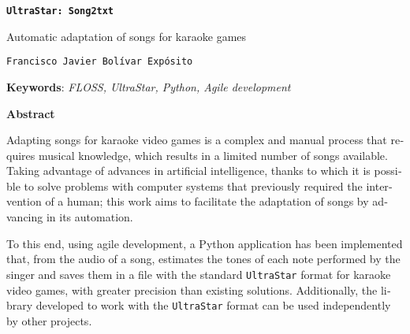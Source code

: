 \begin{otherlanguage}{english}


\begin{center}
\large\bfseries 
\texttt{\normalfont\large\bfseries UltraStar: Song2txt}
	
Automatic adaptation of songs for karaoke games
\end{center}

\begin{center}
	\texttt{\normalfont Francisco Javier Bolívar Expósito}
\end{center}


\vspace{0.5cm}
\noindent\textbf{Keywords}: \textit{FLOSS, UltraStar, Python, Agile development}
\vspace{0.7cm}

\noindent\textbf{Abstract}

Adapting songs for karaoke video games is a complex and manual process that requires musical knowledge, which results in a limited number of songs available. Taking advantage of advances in artificial intelligence, thanks to which it is possible to solve problems with computer systems that previously required the intervention of a human; this work aims to facilitate the adaptation of songs by advancing in its automation.

To this end, using agile development, a Python application has been implemented that, from the audio of a song, estimates the tones of each note performed by the singer and saves them in a file with the standard \texttt{UltraStar} format for karaoke video games, with greater precision than existing solutions. Additionally, the library developed to work with the \texttt{UltraStar} format can be used independently by other projects.

\end{otherlanguage}